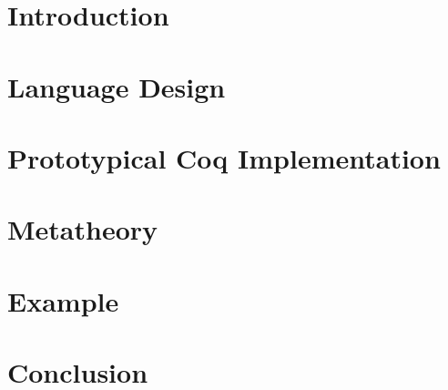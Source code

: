 \begin{abstract}

\end{abstract}

\maketitle

\section{Introduction}
\label{sec:intro}



\section{Language Design}
\label{sec:lang-design}





\newcommand{\denotes}[1]{{\llbracket {#1} \rrbracket}}
\newcommand{\denotesS}[1]{{{\llbracket {#1} \rrbracket}_S}}
\newcommand{\goodCtx}[2]{{ {#1} \ \vdash }}
\newcommand{\goodType}[3]{{ {#1} \vdash {#2} }}
\newcommand{\goodTerm}[3]{{ {#1} \vdash {#2} : {#3} }}
\newcommand{\goodSub}[3]{{ {#1} \vdash {#2} : {#3} }}
\newcommand{\goodSig}[3]{{ {#1} \vdash {#2} \ \  Sig^{#3} }}
\newcommand{\goodWSig}[3]{{ {#1} \vdash {#2} \ \ WSig^{#3} }}
\newcommand{\goodSeal}[4]{{ {#1} \vdash {#2} : {#3} \  |\  {#4} }}
\newcommand{\goodInh}[4]{{ {#1} \vdash {#2} : {#3} \twoheadrightarrow {#4}}}
\newcommand{\nat}{\mathbf{N}}

\newcommand{\cU}{{\mathcal{U}}}
\newcommand{\cB}{{\mathbb{B}}}
\newcommand{\cL}{{\mathcal{L}}}
\newcommand{\cC}{{\mathcal{C}}}
\newcommand{\cCt}{{\mathcal{C}_t}}
\newcommand{\bW}{{\mathbb{W}}}

\section{Prototypical Coq Implementation}
\label{sec:coqimpl}


\section{Metatheory}

\label{sec:metatheory}





\section{Example}\label{sec:coqexample}



\section{Conclusion}
\label{sec:conclusion}

\setlength{\bibsep}{.8ex}


